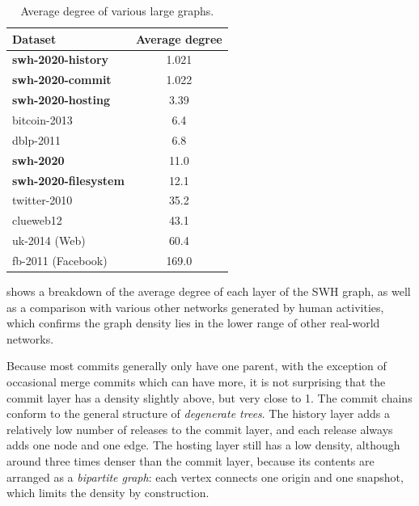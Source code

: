 \begin{table}
  \centering
  \caption{Average degree of various large graphs.}
  \label{tab:degree-comparison}
  \begin{tabular}[t]{l S[table-format=3.3]}
      \textbf{Dataset} & \textbf{Average degree} \\
    \hline
    \textbf{swh-2020-history}    & 1.021 \\
    \textbf{swh-2020-commit}     & 1.022 \\
    \textbf{swh-2020-hosting}    & 3.39 \\
    bitcoin-2013 \cite{maesa2018data}                 & 6.4 \\
    dblp-2011                    & 6.8 \\
    \textbf{swh-2020}            & 11.0 \\
    \textbf{swh-2020-filesystem} & 12.1 \\
    twitter-2010 \cite{kwak2010twitter}      & 35.2 \\
    clueweb12                    & 43.1 \\
    uk-2014 (Web) \cite{BMSB}               & 60.4 \\
    fb-2011 (Facebook) \cite{backstrom2012four}          & 169.0 \\
  \end{tabular}
\end{table}

 shows a breakdown of the average degree of each
layer of the SWH graph, as well as a comparison with various other networks
generated by human activities, which confirms the graph density lies in the
lower range of other real-world networks.

Because most commits generally only have one parent, with the exception of
occasional merge commits which can have more, it is not surprising that the
commit layer has a density slightly above, but very close to 1. The commit
chains conform to the general structure of \emph{degenerate trees}. The history
layer adds a relatively low number of releases to the commit layer, and each
release always adds one node and one edge.
The hosting layer still has a low density, although around three times denser
than the commit layer, because its contents are arranged as a \emph{bipartite
graph}: each vertex connects one origin and one snapshot, which limits the
density by construction.

